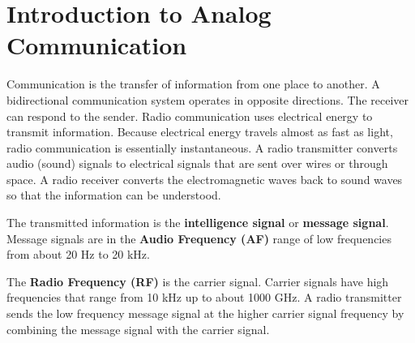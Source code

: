 \chapter [Introduction to Analog Communication]{Introduction to Analog Communication}


\cite{ACmanual}Communication is the transfer of information from one place to another. A bidirectional communication system operates in opposite directions. The receiver can respond
to the sender. Radio communication uses electrical energy to transmit information. Because electrical energy travels almost as fast as light, radio communication is essentially instantaneous.
A radio transmitter converts audio (sound) signals to electrical signals that are sent over wires or through space. A radio receiver converts the electromagnetic waves back to sound waves so that the
information can be understood. 

The transmitted information is the \textbf {intelligence signal} or \textbf{ message signal}.
 Message signals are in the \textbf {Audio Frequency (AF)} range of low frequencies from about 20 Hz to 20 kHz.
 
 
The \textbf{Radio Frequency (RF)}  is the carrier signal. Carrier signals have high frequencies that range from 10 kHz up to about 1000 GHz.
A radio transmitter sends the low frequency message signal at the higher carrier signal frequency by combining the message signal with the carrier signal.

